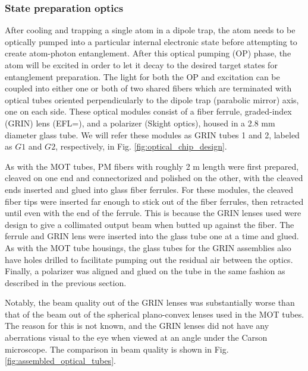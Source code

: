 \subsubsection{State preparation optics}

After cooling and trapping a single atom in a dipole trap, the atom needs to be optically pumped into a particular internal electronic state before attempting to create atom-photon entanglement. After this optical pumping (OP) phase, the atom will be excited in order to let it decay to the desired target states for entanglement preparation. The light for both the OP and excitation can be coupled into either one or both of two shared fibers which are terminated with optical tubes oriented perpendicularly to the dipole trap (parabolic mirror) axis, one on each side. These optical modules consist of a fiber ferrule, graded-index (GRIN) lens (EFL=), and a polarizer (Skight optics), housed in a 2.8 mm diameter glass tube. We will refer these modules as GRIN tubes 1 and 2, labeled as $G1$ and $G2$, respectively, in Fig. \ref{fig:optical_chip_design}.

As with the MOT tubes, PM fibers with roughly 2 m length were first prepared, cleaved on one end and connectorized and polished on the other, with the cleaved ends inserted and glued into glass fiber ferrules. For these modules, the cleaved fiber tips were inserted far enough to stick out of the fiber ferrules, then retracted until even with the end of the ferrule. This is because the GRIN lenses used were design to give a collimated output beam when butted up against the fiber. The ferrule and GRIN lens were inserted into the glass tube one at a time and glued. As with the MOT tube housings, the glass tubes for the GRIN assemblies also have holes drilled to facilitate pumping out the residual air between the optics.  Finally, a polarizer was aligned and glued on the tube in the same fashion as described in the previous section. 

Notably, the beam quality out of the GRIN lenses was substantially worse than that of the beam out of the spherical plano-convex lenses used in the MOT tubes. The reason for this is not known, and the GRIN lenses did not have any aberrations visual to the eye when viewed at an angle under the Carson microscope. The comparison in beam quality is shown in Fig. \ref{fig:assembled_optical_tubes}.

